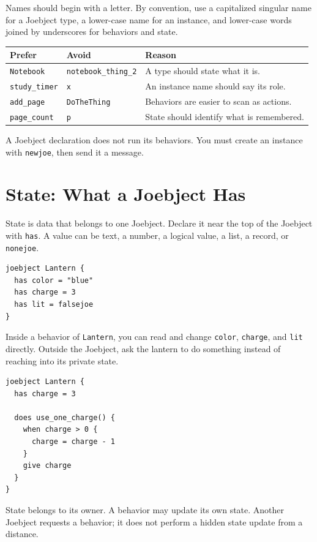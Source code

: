 \documentclass[12pt]{article}
\newcommand{\kw}[1]{\texttt{#1}}
\begin{document}
Names should begin with a letter. By convention, use a capitalized singular name for a Joebject type, a lower-case name for an instance, and lower-case words joined by underscores for behaviors and state.

\begin{longtable}{p{}p{}p{}}
\toprule
\textbf{Prefer} & \textbf{Avoid} & \textbf{Reason}\\
\midrule
\kw{Notebook} & \kw{notebook\_thing\_2} & A type should state what it is.\\
\kw{study\_timer} & \kw{x} & An instance name should say its role.\\
\kw{add\_page} & \kw{DoTheThing} & Behaviors are easier to scan as actions.\\
\kw{page\_count} & \kw{p} & State should identify what is remembered.\\
\bottomrule
\end{longtable}

\begin{warnbox}
A Joebject declaration does not run its behaviors. You must create an instance with \kw{newjoe}, then send it a message.
\end{warnbox}

\clearpage
\section{State: What a Joebject Has}
State is data that belongs to one Joebject. Declare it near the top of the Joebject with \kw{has}. A value can be text, a number, a logical value, a list, a record, or \kw{nonejoe}.

\begin{lstlisting}[style=joe]
joebject Lantern {
  has color = "blue"
  has charge = 3
  has lit = falsejoe
}
\end{lstlisting}

Inside a behavior of \kw{Lantern}, you can read and change \kw{color}, \kw{charge}, and \kw{lit} directly. Outside the Joebject, ask the lantern to do something instead of reaching into its private state.

\begin{lstlisting}[style=joe]
joebject Lantern {
  has charge = 3

  does use_one_charge() {
    when charge > 0 {
      charge = charge - 1
    }
    give charge
  }
}
\end{lstlisting}

\begin{rulebox}
State belongs to its owner. A behavior may update its own state. Another Joebject requests a behavior; it does not perform a hidden state update from a distance.
\end{rulebox}
\end{document}
